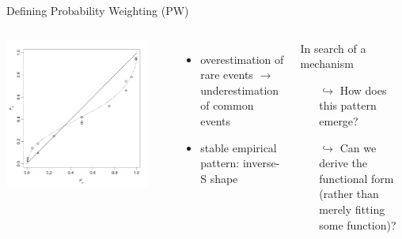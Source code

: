 \begin{frame}{Defining Probability Weighting (PW)}

\begin{columns}[T]
	\includegraphics[width=.9\textwidth]{../../figs/TK1992.pdf}

\parencite[p. 310, Fig. 1,relabelled axes]{TverskyKahneman1992}

\begin{itemize}
  \item overestimation of rare events $\rightarrow$ underestimation of common events
  \item stable empirical pattern: inverse-S shape
\end{itemize}

\bi
	\item	{}
\ei

\begin{block}{In search of a mechanism}
	\begin{itemize}
	  \item[$\hookrightarrow$] How does this pattern emerge?
  	\item[$\hookrightarrow$] Can we derive the functional form (rather than merely fitting some function)?
	\end{itemize}
\end{block}

\end{columns}
\end{frame}

